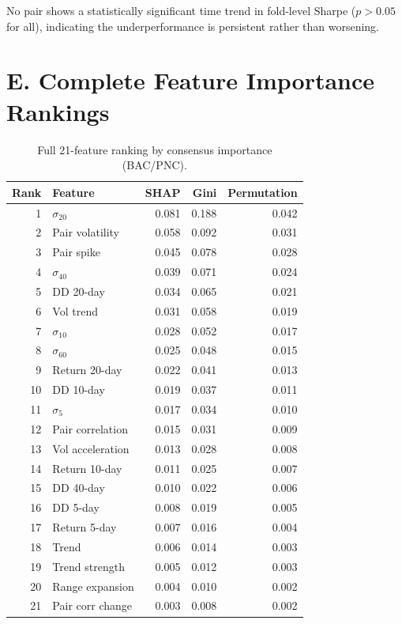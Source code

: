 \documentclass[conference]{IEEEtran}
\begin{document}
No pair shows a statistically significant time trend in fold-level Sharpe
($p > 0.05$ for all), indicating the underperformance is persistent rather
than worsening.

\section{E. Complete Feature Importance Rankings}
\label{sec:features_detail}

\begin{table}[h]
\centering
\caption{Full 21-feature ranking by consensus importance (BAC/PNC).}
\label{tab:supp_feature_full}
\small
\begin{tabular}{rlrrr}
\toprule
Rank & Feature & SHAP & Gini & Permutation \\
\midrule
1 & $\sigma_{20}$ & 0.081 & 0.188 & 0.042 \\
2 & Pair volatility & 0.058 & 0.092 & 0.031 \\
3 & Pair spike & 0.045 & 0.078 & 0.028 \\
4 & $\sigma_{40}$ & 0.039 & 0.071 & 0.024 \\
5 & DD 20-day & 0.034 & 0.065 & 0.021 \\
6 & Vol trend & 0.031 & 0.058 & 0.019 \\
7 & $\sigma_{10}$ & 0.028 & 0.052 & 0.017 \\
8 & $\sigma_{60}$ & 0.025 & 0.048 & 0.015 \\
9 & Return 20-day & 0.022 & 0.041 & 0.013 \\
10 & DD 10-day & 0.019 & 0.037 & 0.011 \\
\midrule
11 & $\sigma_5$ & 0.017 & 0.034 & 0.010 \\
12 & Pair correlation & 0.015 & 0.031 & 0.009 \\
13 & Vol acceleration & 0.013 & 0.028 & 0.008 \\
14 & Return 10-day & 0.011 & 0.025 & 0.007 \\
15 & DD 40-day & 0.010 & 0.022 & 0.006 \\
16 & DD 5-day & 0.008 & 0.019 & 0.005 \\
17 & Return 5-day & 0.007 & 0.016 & 0.004 \\
18 & Trend & 0.006 & 0.014 & 0.003 \\
19 & Trend strength & 0.005 & 0.012 & 0.003 \\
20 & Range expansion & 0.004 & 0.010 & 0.002 \\
21 & Pair corr change & 0.003 & 0.008 & 0.002 \\
\bottomrule
\end{tabular}
\end{table}
\end{document}
